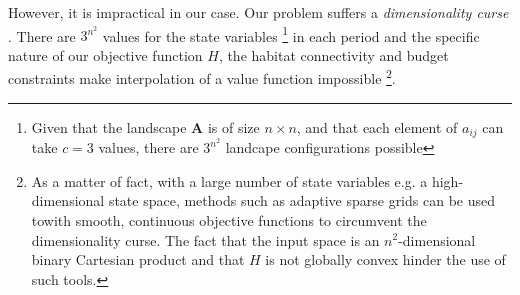 However, it is impractical in our case. Our problem suffers a \textit{dimensionality curse} \citep{Bellman}. There are $3^{n^2}$ values for the state variables \footnote{Given that the landscape $\mathbf{A}$ is of size $n\times n$, and that each element of $a_{ij}$ can take $c=3$ values, there are $3^{n^2}$ landcape configurations possible} in each period and the specific nature of our objective function $H$, the habitat connectivity and budget constraints make interpolation of a value function impossible \footnote{As a matter of fact, with a large number of state variables e.g. a high-dimensional state space, methods such as adaptive sparse grids can be used towith smooth, continuous objective functions \citep{brumm_adaptive_2017} to circumvent the dimensionality curse. The fact that the input space is an $n^2$-dimensional binary Cartesian product and that $H$ is not globally convex hinder the use of such tools.}.


